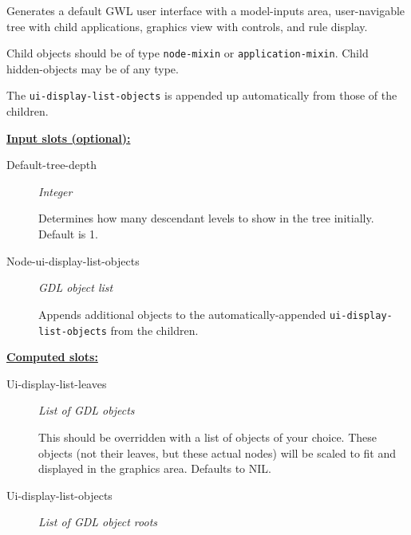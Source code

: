 \documentclass [11pt]{book}
\begin{document}
\begin{itemize}
\begin{description}
Generates a default GWL user interface with a model-inputs area,
user-navigable tree with child applications, graphics view with controls, and rule display. 

Child objects should be of type \texttt{node-mixin} or \texttt{application-mixin}. Child hidden-objects
may be of any type.

The \texttt{ui-display-list-objects} is appended up automatically from those of the children.



\end{description}








\textbf{
\underline{Input slots (optional):}}

\begin{description}

\item [Default-tree-depth]
\emph{Integer}

 Determines how many descendant levels to show in the tree initially. Default is 1.




\item [Node-ui-display-list-objects]
\emph{GDL object list}

 Appends additional objects to the automatically-appended \texttt{ui-display-list-objects}
from the children.




\end{description}






\textbf{
\underline{Computed slots:}}

\begin{description}

\item [Ui-display-list-leaves]
\emph{List of GDL objects}

 This should be overridden with a list of objects of your choice. These objects (not their leaves,
but these actual nodes) will be scaled to fit and displayed in the graphics area. Defaults to NIL.




\item [Ui-display-list-objects]
\emph{List of GDL object roots}


\end{description}
\end{itemize}
\end{document}
